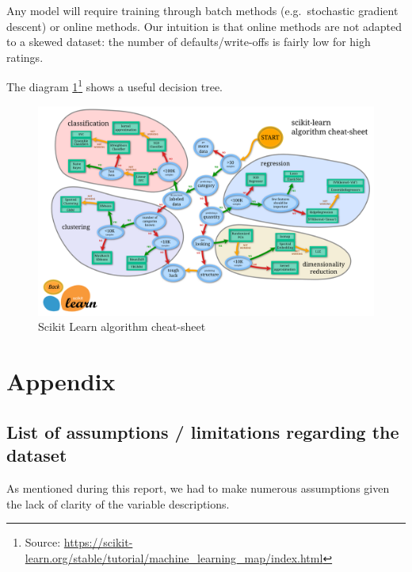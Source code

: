 \documentclass[11pt,]{report}
\let\rmarkdownfootnote\footnote%
\def\footnote{\protect\rmarkdownfootnote}
\begin{document}
Any model will require training through batch methods (e.g.~stochastic gradient descent) or online methods. Our intuition is that online methods are not adapted to a skewed dataset: the number of defaults/write-offs is fairly low for high ratings.

The diagram \ref{fig:scikit-map}\footnote{Source: \url{https://scikit-learn.org/stable/tutorial/machine_learning_map/index.html}} shows a useful decision tree.

\begin{figure}

{\centering \includegraphics[width=0.7\linewidth]{images/scikit-learn-mlmap} 

}

\caption{Scikit Learn algorithm cheat-sheet}\label{fig:scikit-map}
\end{figure}

\hypertarget{appendix}{%
\chapter*{Appendix}\label{appendix}}

\hypertarget{list-of-assumptions-limitations-regarding-the-dataset}{%
\section{List of assumptions / limitations regarding the dataset}\label{list-of-assumptions-limitations-regarding-the-dataset}}

As mentioned during this report, we had to make numerous assumptions given the lack of clarity of the variable descriptions.
\end{document}
